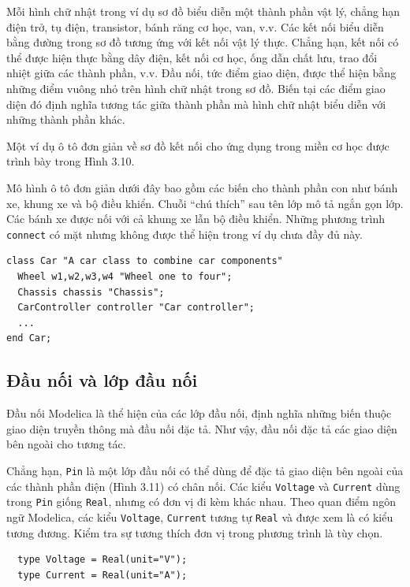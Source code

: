 Mỗi hình chữ nhật trong ví dụ sơ đồ biểu diễn một thành phần vật lý, chẳng hạn điện trở, tụ điện, transistor, bánh răng cơ học, van, v.v. Các kết nối biểu diễn bằng đường trong sơ đồ tương ứng với kết nối vật lý thực. Chẳng hạn, kết nối có thể được hiện thực bằng dây điện, kết nối cơ học, ống dẫn chất lưu, trao đổi nhiệt giữa các thành phần, v.v. Đầu nối, tức điểm giao diện, được thể hiện bằng những điểm vuông nhỏ trên hình chữ nhật trong sơ đồ. Biến tại các điểm giao diện đó định nghĩa tương tác giữa thành phần mà hình chữ nhật biểu diễn với những thành phần khác.

Một ví dụ ô tô đơn giản về sơ đồ kết nối cho ứng dụng trong miền cơ học được trình bày trong Hình 3.10.

Mô hình ô tô đơn giản dưới đây bao gồm các biến cho thành phần con như bánh xe, khung xe và bộ điều khiển. Chuỗi ``chú thích'' sau tên lớp mô tả ngắn gọn lớp. Các bánh xe được nối với cả khung xe lẫn bộ điều khiển. Những phương trình \texttt{connect} có mặt nhưng không được thể hiện trong ví dụ chưa đầy đủ này.
\begin{verbatim}
class Car "A car class to combine car components"
  Wheel w1,w2,w3,w4 "Wheel one to four";
  Chassis chassis "Chassis";
  CarController controller "Car controller";
  ...
end Car;
\end{verbatim}

\subsection{Đầu nối và lớp đầu nối}
Đầu nối Modelica là thể hiện của các lớp đầu nối, định nghĩa những biến thuộc giao diện truyền thông mà đầu nối đặc tả. Như vậy, đầu nối đặc tả các giao diện bên ngoài cho tương tác.

Chẳng hạn, \texttt{Pin} là một lớp đầu nối có thể dùng để đặc tả giao diện bên ngoài của các thành phần điện (Hình 3.11) có chân nối. Các kiểu \texttt{Voltage} và \texttt{Current} dùng trong \texttt{Pin} giống \texttt{Real}, nhưng có đơn vị đi kèm khác nhau. Theo quan điểm ngôn ngữ Modelica, các kiểu \texttt{Voltage}, \texttt{Current} tương tự \texttt{Real} và được xem là có kiểu tương đương. Kiểm tra sự tương thích đơn vị trong phương trình là tùy chọn.
\begin{verbatim}
  type Voltage = Real(unit="V");
  type Current = Real(unit="A");
\end{verbatim}

